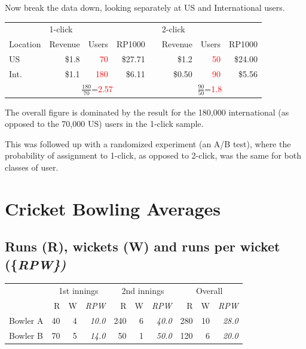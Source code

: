 \documentclass[
  10pt,
  b5paper]{book}
\begin{document}
Now break the data down, looking separately at US and International users.

\begin{tabular}{l r r r r r r r}
& \multicolumn{3}{l}{1-click} & & \multicolumn{3}{l}{2-click}\\
Location   & Revenue & Users   & RP1000 && Revenue & Users & RP1000\\
US & \$1.8   & \textcolor{red}{70}  &\$27.71 && \$1.2 & \textcolor{red}{50}  & \$24.00\\
Int. & \$1.1   & \textcolor{red}{180} &\$6.11  && \$0.50 & \textcolor{red}{90} & \$5.56\\
& \multicolumn{3}{c}{$\frac{180}{70}$=\textcolor{red}{2.57}} & & \multicolumn{3}{c}{$\frac{90}{50}$=\textcolor{red}{1.8}}\\
\end{tabular}

The overall figure is dominated by the result for the 180,000 international
(as opposed to the 70,000 US) users in the 1-click sample.

This was followed up with a randomized experiment (an A/B test), where
the probability of assignment to 1-click, as opposed to 2-click, was
the same for both classes of user.

\hypertarget{cricket-bowling-averages}{%
\section{Cricket Bowling Averages}\label{cricket-bowling-averages}}

\hypertarget{runs-r-wickets-w-and-runs-per-wicket}{%
\subsection*{\texorpdfstring{Runs (R), wickets (W) and runs per wicket (\{\em RPW\})}{Runs (R), wickets (W) and runs per wicket (\{\})}}\label{runs-r-wickets-w-and-runs-per-wicket}}

\vspace*{-8pt}

\begin{center}
\begin{tabular}{lrrr||rrr||rrr}
\hline
 & \multicolumn{3}{c}{1st innings} & \multicolumn{3}{c}{2nd innings} &
\multicolumn{3}{c}{Overall} \\
\cline{2-4} \cline{5-7} \cline{8-10}
& R & W & {\em RPW}   & R & W & {\em RPW} & R & W
& {\em RPW}\\
Bowler A & 40 & 4 & {\em 10.0} & 240 & 6 & {\em 40.0} & 280 & 10 &
{\em 28.0}\\
Bowler B & 70 & 5 & {\em 14.0} & 50 & 1 & {\em 50.0} & 120 & 6 & {\em 20.0} \\
\hline
\end{tabular}
\end{center}
\end{document}
